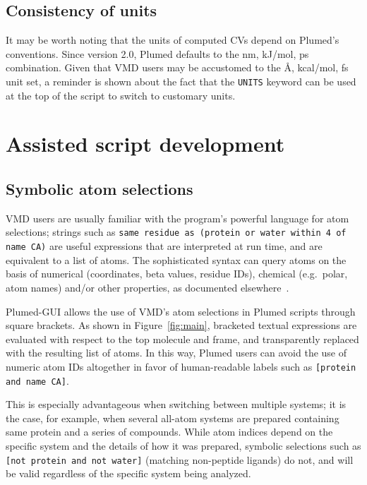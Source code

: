\documentclass[preprint,review,11pt]{elsarticle}
\begin{document}


\subsection{Consistency of units}

It may be worth noting that the units of computed CVs depend on
Plumed's conventions.  Since version 2.0, Plumed defaults to the nm,
kJ/mol, ps combination. Given that VMD users may be accustomed to the
\AA, kcal/mol, fs unit set, a reminder is shown about the fact that
the \texttt{UNITS} keyword can be used at the top of the script to
switch to customary units.



\section{Assisted script development}


\subsection{Symbolic atom selections}\label{sec:symb-atom-select}

VMD users are usually familiar with the program's powerful language
for atom selections; strings such as \texttt{same residue as (protein
  or water within 4 of name CA)} are useful expressions that are
interpreted at run time, and are equivalent to a list of atoms.  The
sophisticated syntax can query atoms on the basis of numerical
(coordinates, beta values, residue IDs), chemical (e.g.\ polar, atom
names) and/or other properties, as documented
elsewhere~\cite{Humphrey_Dalke_Schulten_1996}.

Plumed-GUI allows the use of VMD's atom selections in Plumed scripts
through  square brackets. As shown in Figure~\ref{fig:main},
bracketed textual expressions  are evaluated with respect to
the top molecule and frame, and transparently replaced with the
resulting list of atoms. In this way, Plumed users can 
avoid the use of numeric atom IDs altogether in favor of human-readable
labels such as \texttt{[protein and name CA]}.

This is especially advantageous when switching between multiple
systems; it is the case, for example, when several all-atom systems
are prepared containing same protein and a series of compounds.
While atom indices depend on the specific system and the details of
how it was prepared, symbolic selections such as \texttt{[not protein
  and not water]} (matching non-peptide ligands) do not, and will be
valid regardless of the specific system being analyzed.
\end{document}
